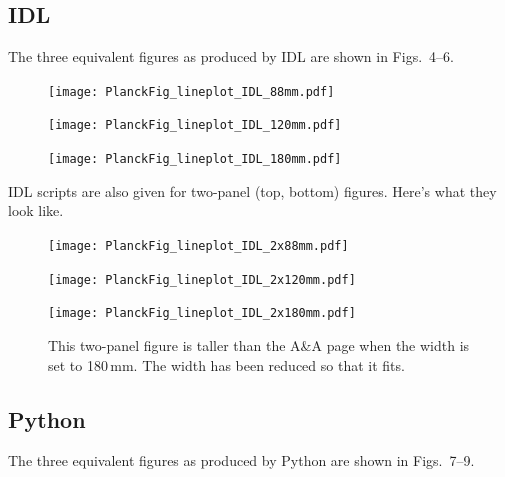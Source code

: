 \documentclass[traditabstract]{aa}
\begin{document}
\clearpage






\subsection{IDL}

The three equivalent figures as produced by IDL are shown in Figs.~4--6.

\begin{figure}[h]
\texttt{[image: PlanckFig\_lineplot\_IDL\_88mm.pdf]}
\caption{\fcaption} 
\end{figure}

\begin{figure}
\sidecaption
\texttt{[image: PlanckFig\_lineplot\_IDL\_120mm.pdf]}
\caption{\fcaption}
\end{figure}

\begin{figure}
\texttt{[image: PlanckFig\_lineplot\_IDL\_180mm.pdf]}
\caption{\fcaption}
\end{figure}

\clearpage

IDL scripts are also given for two-panel (top, bottom) figures.  Here's what they look like.


\begin{figure}[h]
\texttt{[image: PlanckFig\_lineplot\_IDL\_2x88mm.pdf]}
\caption{\fcaption} 
\end{figure}

\begin{figure}
\sidecaption
\texttt{[image: PlanckFig\_lineplot\_IDL\_2x120mm.pdf]}
\caption{\fcaption}
\end{figure}

\begin{figure}
\texttt{[image: PlanckFig\_lineplot\_IDL\_2x180mm.pdf]}
\caption{This two-panel figure is taller than the A\&A page when the width is set to 180\,mm.  The width has been reduced so that it fits.}%
\end{figure}

\clearpage





\subsection{Python}

The three equivalent figures as produced by Python are shown in Figs.~7--9.
\end{document}
